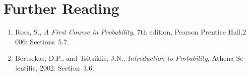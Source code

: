 \section*{Further Reading}

\begin{small}
\begin{enumerate}
\item Ross, S., \emph{A First Course in Probability}, 7th edition, Pearson Prentice Hall,2
006: Sections~5.7.
\item Bertsekas, D.P., and Tsitsiklis, J.N., \emph{Introduction to Probability}, Athena Sc
ientific, 2002: Section~3.6.
\end{enumerate}
\end{small}

